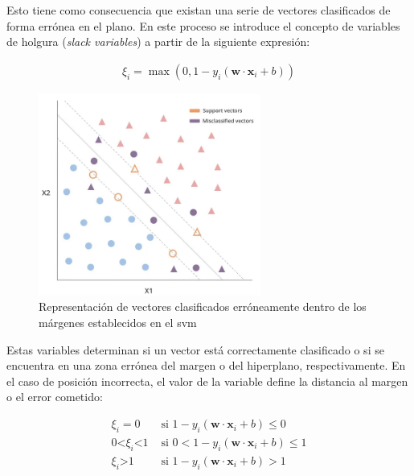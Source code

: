 \vspace{3mm}

Esto tiene como consecuencia que existan una serie de vectores clasificados de forma errónea en el plano. En este proceso se introduce el concepto de variables de holgura (\textit{slack variables}) a partir de la siguiente expresión:

\begin{equation}
    \begin{aligned}
        \xi_i = \max(0, 1 - y_i (\mathbf{w} \cdot \mathbf{x}_i + b))
    \end{aligned}
\end{equation} 

\vspace{3mm}

\begin{figure}[h!]
    \centering
    \includegraphics[width=0.65\textwidth]{img/teoria/svm2.png}
    \caption{Representación de vectores clasificados erróneamente dentro de los márgenes establecidos en el \acrshort{svm} \cite{svmmedium}}
    \label{fig:svmerror}
\end{figure}

\vspace{3mm}

Estas variables determinan si un vector está correctamente clasificado o si se encuentra en una zona errónea del margen o del hiperplano, respectivamente. En el caso de posición incorrecta, el valor de la variable define la distancia al margen o el error cometido:

\begin{equation}
    \begin{aligned}
        \xi_i = 0 & \text{ si } 1 - y_i (\mathbf{w} \cdot \mathbf{x}_i + b) \leq 0 \\
        0 \text{<} \xi_i \text{<} 1 & \text{ si } 0 < 1 - y_i (\mathbf{w} \cdot \mathbf{x}_i + b) \leq 1 \\
        \xi_i \text{>} 1 & \text{ si } 1 - y_i (\mathbf{w} \cdot \mathbf{x}_i + b) > 1 \\
    \end{aligned}
\end{equation} 


